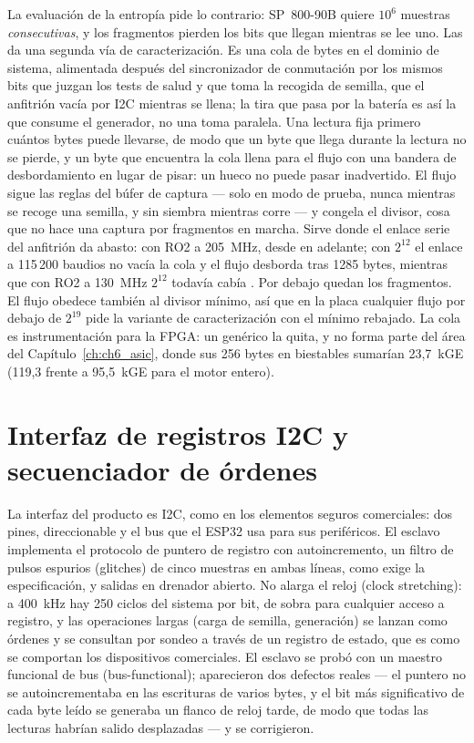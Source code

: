La evaluación de la entropía pide lo contrario: SP~800-90B quiere $10^6$
muestras \emph{consecutivas}, y los fragmentos pierden los bits que llegan
mientras se lee uno. Las da una segunda vía de caracterización. Es una
cola de bytes en el dominio de sistema, alimentada después del
sincronizador de conmutación por los mismos bits que juzgan los tests de
salud y que toma la recogida de semilla, que el anfitrión vacía por
\ac{I2C} mientras se llena; la tira que pasa por la batería es así la que
consume el generador, no una toma paralela. Una lectura fija primero
cuántos bytes puede llevarse, de modo que un byte que llega durante la
lectura no se pierde, y un byte que encuentra la cola llena para el flujo
con una bandera de desbordamiento en lugar de pisar: un hueco no puede
pasar inadvertido. El flujo sigue las reglas del búfer de captura ---
solo en modo de prueba, nunca mientras se recoge una semilla, y sin
siembra mientras corre --- y congela el divisor, cosa que no hace una
captura por fragmentos en marcha. Sirve donde el enlace
serie del anfitrión da abasto: con RO2 a 205~MHz, desde  en
adelante; con $2^{12}$ el enlace a 115\,200 baudios no vacía la cola y
el flujo desborda tras 1285 bytes, mientras que con RO2 a 130~MHz
$2^{12}$ todavía cabía \meas{}. Por debajo quedan los fragmentos. El
flujo obedece también al divisor mínimo, así que en la placa cualquier
flujo por debajo de $2^{19}$ pide la variante de caracterización con el
mínimo rebajado. La cola es
instrumentación para la \ac{FPGA}: un genérico la quita, y no forma parte
del área del Capítulo~\ref{ch:ch6_asic}, donde sus 256 bytes en
biestables sumarían 23,7~kGE \simu{} (119,3 frente a 95,5~kGE para el
motor entero).

\section{Interfaz de registros I2C y secuenciador de órdenes}
\label{sec:i2c}

La interfaz del producto es \ac{I2C}, como en los elementos seguros
comerciales: dos pines, direccionable y el bus que el ESP32 usa para sus
periféricos. El esclavo implementa el protocolo de puntero de registro
con autoincremento, un filtro de pulsos espurios (glitches) de cinco
muestras en ambas líneas, como exige la especificación, y salidas en
drenador abierto. No alarga el reloj (clock stretching): a 400~kHz hay
250 ciclos del sistema por bit, de sobra para cualquier acceso a
registro, y las operaciones largas (carga de semilla, generación) se
lanzan como órdenes y se consultan por sondeo a través de un registro de
estado, que es como se comportan los dispositivos comerciales. El
esclavo se probó con un maestro funcional de bus (bus-functional);
aparecieron dos defectos reales --- el puntero no se autoincrementaba en
las escrituras de varios bytes, y el bit más significativo de cada byte
leído se generaba un flanco de reloj tarde, de modo que todas las
lecturas habrían salido desplazadas --- y se corrigieron.

